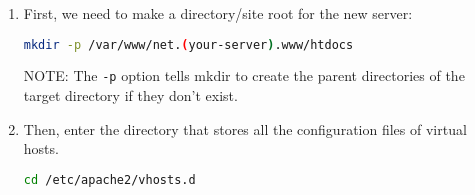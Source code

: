 \documentclass[11pt]{article}
\begin{document}
\begin{enumerate}

  \item First, we need to make a directory/site root for the new server:
  \begin{lstlisting}[basicstyle=\ttfamily, backgroundcolor = \color{lightgray}, language = bash, xleftmargin = 0cm, framexleftmargin = 1em] 
mkdir -p /var/www/net.(your-server).www/htdocs
\end{lstlisting}
  NOTE: The \verb|-p| option tells mkdir to create the parent directories of the target directory if they don't exist.

  \item Then, enter the directory that stores all the configuration files of virtual hosts.
  \begin{lstlisting}[basicstyle=\ttfamily, backgroundcolor = \color{lightgray}, language = bash, xleftmargin = 0cm, framexleftmargin = 1em] 
cd /etc/apache2/vhosts.d
\end{lstlisting}


\end{enumerate}
\end{document}
